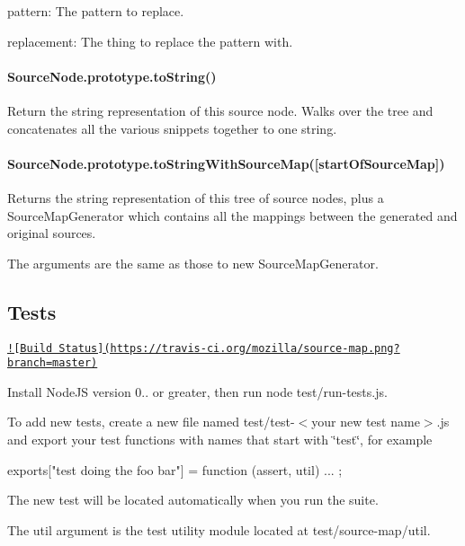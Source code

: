 \begin{DoxyItemize}
\item {\ttfamily pattern}\+: The pattern to replace.
\item {\ttfamily replacement}\+: The thing to replace the pattern with.
\end{DoxyItemize}

\paragraph*{Source\+Node.\+prototype.\+to\+String()}

Return the string representation of this source node. Walks over the tree and concatenates all the various snippets together to one string.

\paragraph*{Source\+Node.\+prototype.\+to\+String\+With\+Source\+Map(\mbox{[}start\+Of\+Source\+Map\mbox{]})}

Returns the string representation of this tree of source nodes, plus a Source\+Map\+Generator which contains all the mappings between the generated and original sources.

The arguments are the same as those to {\ttfamily new Source\+Map\+Generator}.

\subsection*{Tests}

\href{https://travis-ci.org/mozilla/source-map}{\tt !\mbox{[}Build Status\mbox{]}(https\+://travis-\/ci.\+org/mozilla/source-\/map.\+png?branch=master)}

Install Node\+J\+S version 0.. or greater, then run {\ttfamily node test/run-\/tests.\+js}.

To add new tests, create a new file named {\ttfamily test/test-\/$<$your new test name$>$.js} and export your test functions with names that start with \char`\"{}test\char`\"{}, for example \begin{DoxyVerb}exports["test doing the foo bar"] = function (assert, util) {
  ...
};
\end{DoxyVerb}


The new test will be located automatically when you run the suite.

The {\ttfamily util} argument is the test utility module located at {\ttfamily test/source-\/map/util}.

